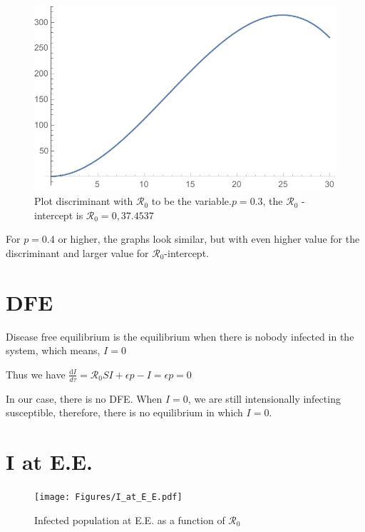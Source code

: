 \documentclass[12pt]{article}
\begin{document}
\begin{figure}[H]
  \caption{Plot discriminant with $\mathcal{R}_0$ to be the variable.$p=0.3$, the $\mathcal{R}_0$ -intercept is $\mathcal{R}_0 = 0, 37.4537$}
  \centering
  \includegraphics[width=1.1\textwidth]{Figures/Plot_R_0_p_0_3.pdf}
\end{figure}

For $p=0.4$ or higher, the graphs look similar, but with even higher value for the discriminant and larger value for $\mathcal{R}_0$-intercept.

\section{DFE}

Disease free equilibrium is the equilibrium when there is nobody infected in the system, which means, $I=0$

Thus we have $\frac{\mathrm{d}I}{d\tau}=\mathcal{R}_0 SI+\epsilon p-I=\epsilon p=0$

In our case, there is no DFE. When $I=0$, we are still intensionally infecting susceptible,  therefore, there is no equilibrium in which $I=0$.

\section{I at E.E.}

\begin{figure}[H]
  \caption{Infected population at E.E. as a function of $\mathcal{R}_0$}
  \centering
  \texttt{[image: Figures/I\_at\_E\_E.pdf]}
\end{figure}
\end{document}
